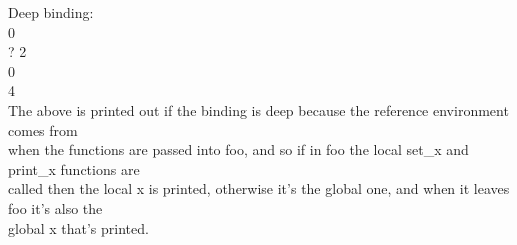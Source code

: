 \documentclass[12pt]{article}
\begin{document}
\begin{flushleft}
\qquad Deep binding:\\
[2mm]

\qquad {} 0\\
\qquad \qquad ? 2\\
\qquad {} 0\\
\qquad {} 4\\

\qquad The above is printed out if the binding is deep because the reference environment comes from\\
\qquad when the functions are passed into foo, and so if in foo the local set\_x and print\_x functions are\\
\qquad called then the local x is printed, otherwise it's the global one, and when it leaves foo it's also the\\
\qquad global x that's printed.\\

\end{flushleft}
\end{document}
